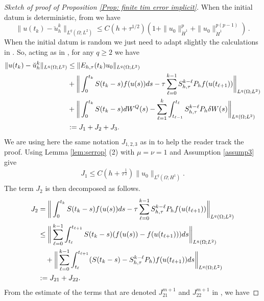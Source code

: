 \documentclass[reqno, 11pt]{amsart}
\newcommand{\gsnote}[1]{\textcolor{Cerulean}{#1}}
\theoremstyle{plain}
\theoremstyle{definition}
\theoremstyle{remark}
\numberwithin{equation}{section}
\numberwithin{theorem}{section}
\begin{document}
{\begin{proof}[Sketch of proof of Proposition \ref{Prop: finite tim error implicit}]
When the initial datum is deterministic, from \cite[equation (4.14) and bound after (4.19)]{liu2021strong} we have 
$$
\|u(t_k)-\breve{u}_h^k\|_{L^q(\Omega; L^2)}\leq C (h+\tau^{1/2}) (1+\|u_0\|_{\dot{H}^1}^{p} + \|u_0\|_{\dot{H}^1}^{p(p-1)}) \,.
$$
When the initial datum is random we just need to adapt slightly the calculations in \cite{liu2021strong}. So,  acting as in \cite[Proof of Lemma 4.2]{liu2021strong}, for any $q\geq 2$ we have
\begin{align}
\|u(t_k)-\breve{u}_h^k\|_{L^q(\Omega; L^2)}
&\leq \|E_{h,\tau}(t_k)u_0\|_{L^q(\Omega;L^2)}\\
&+\bigg\|\int_0^{t_k}S(t_k-s)f(u(s))ds-\tau\sum\limits_{\ell=0}^{k-1} S_{h,\tau}^{k-\ell}P_hf(u(t_{\ell+1}))\bigg\|_{L^q(\Omega;L^2)}\notag\\
&+\bigg\|\int_0^{t_k}S(t_k-s)dW^Q(s)-\sum\limits_{\ell=1}^k \int_{t_{\ell-1}}^{t_\ell}S_{h,\tau}^{k-\ell}P_h\delta W(s)\bigg\|_{L^q(\Omega;L^2)}\notag\\
&:=J_1+J_2+J_3.
\end{align}
We are using here the same notation $J_{1,2,3}$ as in \cite{liu2021strong} to help the reader track the proof. 
Using Lemma \ref{lem:serrop} (2) with $\mu=\nu=1$ and Assumption \ref{assump3} give 
\begin{align}
J_1\leq C(h+\tau^{\frac{1}{2}})\|u_0\|_{L^q(\Omega;H^1)}.
\end{align}
The term $J_2$ is then decomposed as follows.
\begin{align}
J_2&=\bigg\|\int_0^{t_k}S(t_k-s)f(u(s))ds-\tau\sum\limits_{\ell=0}^{k-1}S_{h,\tau}^{k-\ell}P_hf(u(t_{\ell+1}))\bigg\|_{L^q(\Omega;L^2)}\notag\\
&\leq \bigg\|\sum\limits_{\ell=0}^{k-1}\int_{t_{\ell}}^{t_{\ell+1}}S(t_k-s)(f(u(s))-f(u(t_{\ell+1})))ds\bigg\|_{L^q(\Omega;L^2)}\notag\\
&\quad+\bigg\|\sum\limits_{\ell=0}^{k-1} \int_{t_{\ell}}^{t_{\ell+1}} (S(t_k-s)-S_{h,\tau}^{k-\ell}P_h)f(u(t_{\ell+1}))ds\bigg\|_{L^q(\Omega;L^2)}\notag\\
&:=J_{21}+J_{22}.
\end{align}
From the estimate of the terms that are denoted $J_{21}^{m+1}$ and $J_{22}^{m+1}$ in \cite[Lemma 4.2]{liu2021strong}, we have

\end{proof}}
\end{document}
